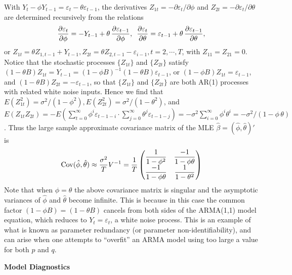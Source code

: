 \begin{ex}
 With $Y_t - \phi Y_{t-1} = \varepsilon_t - \theta\varepsilon_{t-1}$, the derivatives $Z_{1t} = -\partial\varepsilon_t/\partial\phi$ and $Z_{2t} = -\partial\varepsilon_t/\partial\theta$ are determined recursively from the relations
	\[
	\frac{\partial\varepsilon_t}{\partial\phi} = -Y_{t-1} + \theta\, \frac{\partial\varepsilon_{t-1}}{\partial\phi}, \enskip \frac{\partial\varepsilon_t}{\partial\theta} = \varepsilon_{t-1} + \theta \, \frac{\partial\varepsilon_{t-1}}{\partial\theta},
	\]
or $Z_{1t} = \theta Z_{1,t-1} + Y_{t-1}, Z_{2t} = \theta Z_{2,t-1} - \varepsilon_{i-1}, t= 2,\cdots,T$, with $Z_{11} = Z_{21} = 0$. Notice that the stochastic processes $\{Z_{1t}\}$ and $\{Z_{2t}\}$ satisfy $(1 - \theta B)Z_{1t} = Y_{t-1} = (1 - \phi B)^{-1}(1 - \theta B)\varepsilon_{t-1}$, or $(1 - \phi B)Z_{1t} = \varepsilon_{t-1}$, and $(1 - \theta B)Z_{2t} = -\varepsilon_{t-1}$, so that $\{Z_{1t}\}$ and $\{Z_{2t}\}$ are both AR(1) processes with related white noise inputs. Hence we find that $E(Z_{1t}^2) = \sigma^2/(1 - \phi^2), E(Z_{2t}^2) = \sigma^2/(1 - \theta^2)$, and $E(Z_{1t}Z_{2t}) = -E\left(\sum_{t=0}^\infty\phi^i\varepsilon_{t-1-i} \cdot \sum_{j=0}^\infty\theta^j\varepsilon_{t-1-j}\right) = -\sigma^2\sum_{i=0}^\infty\phi^i\theta^i = -\sigma^2/(1 - \phi\,\theta)$. Thus the large sample approximate covariance matrix of the MLE $\hat{\beta} = (\hat{\phi},\hat{\theta})'$ is
	\[
	\operatorname{Cov}(\hat{\phi}, \hat{\theta}) \approx \frac{\sigma^2}{T} V^{-1} = \frac{1}{T} 
	\begin{pmatrix}
	\dfrac{1}{1-\phi^2} & \dfrac{-1}{1-\phi \theta} \\
	\dfrac{-1}{1-\phi \theta} & \dfrac{1}{1-\theta^2}
	\end{pmatrix}
	\]
Note that when $\phi = \theta$ the above covariance matrix is singular and the asymptotic variances of $\hat{\phi}$ and $\hat{\theta}$ become infinite. This is because in this case the common factor $(1- \phi B) = (1 - \theta B)$ cancels from both sides of the ARMA(1,1) model equation, which reduces to $Y_t = \varepsilon_t$, a white noise process. This is an example of what is known as parameter redundancy (or parameter non-identifiability), and can arise when one attempts to ``overfit'' an ARMA model using too large a value for both $p$ and $q$. \\
\end{ex}


\noindent\textbf{Model Diagnostics} \\


